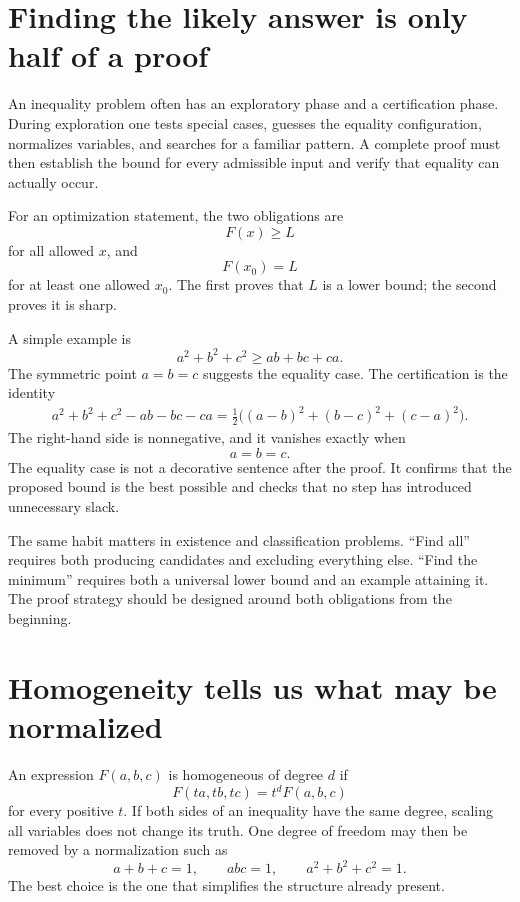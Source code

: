 
\section{Finding the likely answer is only half of a proof}

An inequality problem often has an exploratory phase and a certification phase.  During exploration one tests special cases, guesses the equality configuration, normalizes variables, and searches for a familiar pattern.  A complete proof must then establish the bound for every admissible input and verify that equality can actually occur.

For an optimization statement, the two obligations are
\[
  F(x)\ge L
\]
for all allowed \(x\), and
\[
  F(x_0)=L
\]
for at least one allowed \(x_0\).  The first proves that \(L\) is a lower bound; the second proves it is sharp.

A simple example is
\[
  a^2+b^2+c^2\ge ab+bc+ca.
\]
The symmetric point \(a=b=c\) suggests the equality case.  The certification is the identity
\[
\begin{aligned}
  a^2+b^2+c^2-ab-bc-ca
  =\frac12\bigl((a-b)^2+(b-c)^2+(c-a)^2\bigr).
\end{aligned}
\]
The right-hand side is nonnegative, and it vanishes exactly when
\[
  a=b=c.
\]
The equality case is not a decorative sentence after the proof.  It confirms that the proposed bound is the best possible and checks that no step has introduced unnecessary slack.

The same habit matters in existence and classification problems.  ``Find all'' requires both producing candidates and excluding everything else.  ``Find the minimum'' requires both a universal lower bound and an example attaining it.  The proof strategy should be designed around both obligations from the beginning.

\section{Homogeneity tells us what may be normalized}

An expression \(F(a,b,c)\) is homogeneous of degree \(d\) if
\[
  F(ta,tb,tc)=t^dF(a,b,c)
\]
for every positive \(t\).  If both sides of an inequality have the same degree, scaling all variables does not change its truth.  One degree of freedom may then be removed by a normalization such as
\[
  a+b+c=1,
  \qquad
  abc=1,
  \qquad
  a^2+b^2+c^2=1.
\]
The best choice is the one that simplifies the structure already present.

